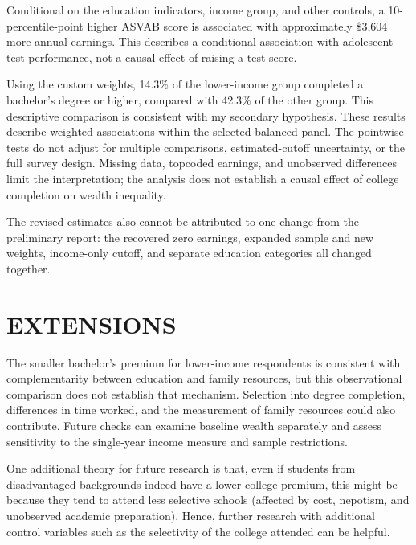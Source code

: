\documentclass[12pt,letterpaper]{article}
\begin{document}
Conditional on the education indicators, income group, and other controls, a
10-percentile-point higher ASVAB score is associated with approximately \$3,604
more annual earnings. This describes a conditional association with adolescent
test performance, not a causal effect of raising a test score.\newline

Using the custom weights, 14.3\% of the lower-income group completed a bachelor's
degree or higher, compared with 42.3\% of the other group. This descriptive comparison
is consistent with my secondary hypothesis. These results describe weighted
associations within the selected balanced panel. The pointwise tests do not adjust
for multiple comparisons, estimated-cutoff uncertainty, or the full survey design.
Missing data, topcoded earnings, and unobserved differences
limit the interpretation; the analysis does not establish a causal effect of college
completion on wealth inequality.\newline

The revised estimates also cannot be attributed to one change from the preliminary
report: the recovered zero earnings, expanded sample and new weights, income-only
cutoff, and separate education categories all changed together.\newline

\section*{EXTENSIONS}
The smaller bachelor's premium for lower-income respondents is consistent with
complementarity between education and family resources, but this observational
comparison does not establish that mechanism. Selection into degree completion,
differences in time worked, and the measurement of family resources could also
contribute. Future checks can examine baseline wealth separately and assess
sensitivity to the single-year income measure and sample restrictions.\newline

One additional theory for future research is that, even if students from disadvantaged
backgrounds indeed have a lower college premium, this might be because they tend to
attend less selective schools (affected by cost, nepotism, and unobserved academic
preparation). Hence, further research with additional control variables such as the
selectivity of the college attended can be helpful.
\end{document}
